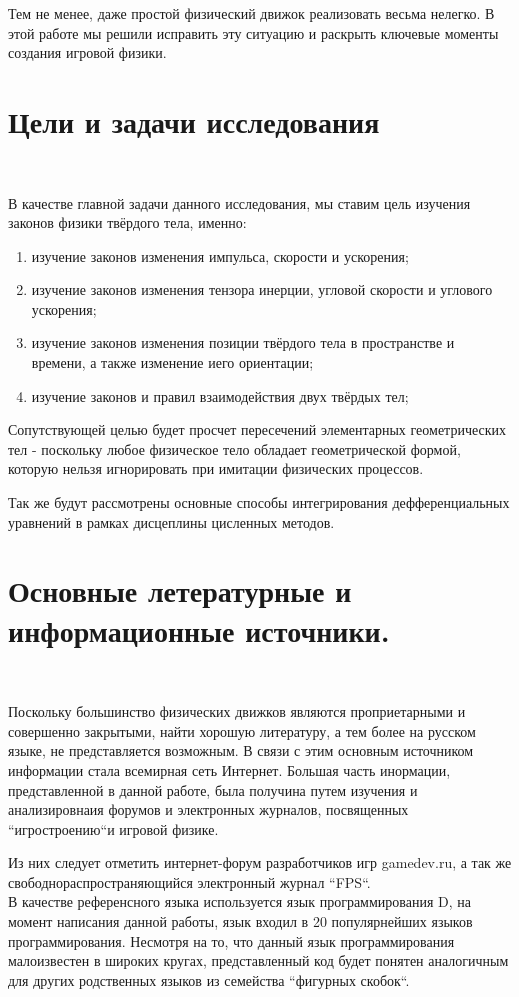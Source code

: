 Тем не менее, даже простой физический движок
реализовать весьма нелегко. В этой работе мы решили исправить эту
ситуацию и раскрыть ключевые моменты создания игровой физики.

\section{Цели и задачи исследования} 
\

В качестве главной задачи данного исследования, мы ставим цель
изучения законов физики твёрдого тела,  именно:

\begin{enumerate}
\item изучение законов изменения импульса, скорости и ускорения; \\
\item изучение законов изменения тензора инерции, угловой скорости
и углового ускорения; \\ 
\item изучение законов изменения позиции твёрдого тела в пространстве
и времени, а также изменение иего ориентации; \\
\item изучение законов и правил взаимодействия двух твёрдых тел; \\
\end{enumerate}

Сопутствующей целью будет просчет пересечений элементарных 
геометрических тел - поскольку любое физическое тело обладает
геометрической формой, которую нельзя игнорировать при имитации 
физических процессов.

Так же будут рассмотрены основные способы интегрирования
дефференциальных уравнений в рамках дисцеплины цисленных методов.

\section{Основные летературные и информационные источники.}
\

Поскольку большинство физических движков являются проприетарными
и совершенно закрытыми, найти хорошую литературу, а тем более
на русском языке, не представляется возможным. В связи с этим основным
источником информации стала всемирная сеть Интернет. Большая часть 
инормации, представленной в данной работе, была получина путем изучения
и анализировнаия форумов и электронных журналов, посвященных
``игростроению``и игровой физике.

Из них следует отметить интернет-форум разработчиков игр gamedev.ru,
а так же свободнораспространяющийся электронный журнал ``FPS``.
\\

В качестве референсного языка используется язык программирования D,
на момент написания данной работы, язык входил в 20 популярнейших языков
программирования. Несмотря на то, что данный язык программирования 
малоизвестен в широких кругах, представленный код будет понятен аналогичным 
для других родственных языков из семейства ``фигурных скобок``.


